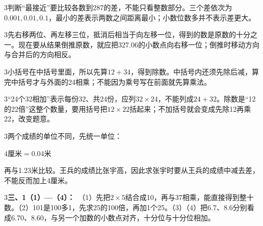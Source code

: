 \documentclass[multi=snippet,border={5bp 20bp 5bp 5bp}]{standalone}
\newenvironment{snippet}[3]{\begin{minipage}{#1bp}\color{answerred}\fontsize{#2}{#3}\selectfont\raggedright}{\end{minipage}}
\begin{document}
\begin{snippet}{505}{11.5}{14}\begin{multicols}{3}\raggedcolumns 判断“最接近”要比较各数到287的差，不能只看整数部分。三个差依次为\(0.001,\allowbreak 0.01,\allowbreak 0.1\)\allowbreak ，最小的差表示两数之间距离最小；小数位数多并不表示差更大。\end{multicols}\end{snippet}
\begin{snippet}{505}{11.5}{14}\begin{multicols}{3}\raggedcolumns 先右移两位、再左移三位，抵消后相当于向左移一位，得到的数是原数的十分之一。现在要从结果倒推原数，就应把327.06的小数点向右移一位；倒推时移动方向与合并后的方向相反。\end{multicols}\end{snippet}
\begin{snippet}{505}{11.5}{14}\begin{multicols}{3}\raggedcolumns 小括号在中括号里面，所以先算\(12+34\)\allowbreak ，得到除数。中括号内还须先除后减，算完中括号才与外面的24相乘；不能因为乘号写在前面就先算乘法。\end{multicols}\end{snippet}
\begin{snippet}{505}{11.5}{14}\begin{multicols}{3}\raggedcolumns “24个32相加”表示每份32、共24份，应列\(32\times24\)\allowbreak ，不能列成\(24+32\)\allowbreak 。除数是“12的22倍”这整个数量，要用括号把\(12\times22\)\allowbreak 括起来；不加括号就会变成先除12再乘22，改变题意。\end{multicols}\end{snippet}
\begin{snippet}{505}{11.5}{14}\begin{multicols}{3}\raggedcolumns 两个成绩的单位不同，先统一单位：\par\noindent\(\displaystyle 4\text{厘米}=0.04\text{米}\)\allowbreak \par 再与1.23米比较。王兵的成绩比张宇高，因此求张宇时要从王兵的成绩中减去差，不能反而加上4厘米。\end{multicols}\end{snippet}
\begin{snippet}{505}{11.5}{14}\begin{multicols}{3}\raggedcolumns \textbf{三、1（1）—（4）：}\ （1）先把\(2\times5\)\allowbreak 结合成10，再与37相乘，能直接得到整十数。（2）101是100多1，先求25的100倍，再加1个25。（3）（4）把6.7、8.6分别看成6.70、8.60，与另一个加数的小数点对齐，十分位与十分位相加。\end{multicols}\end{snippet}
\end{document}
